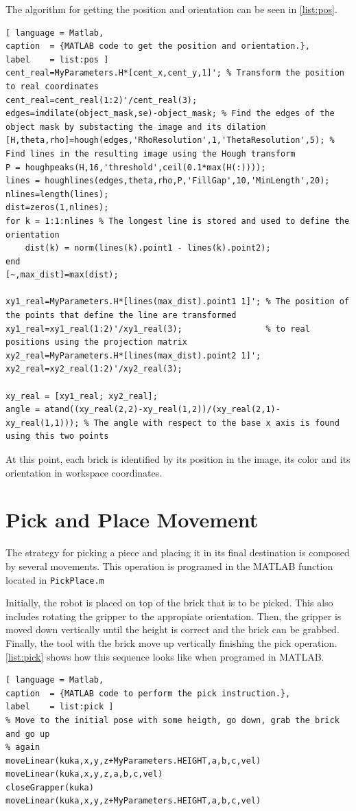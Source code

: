 The algorithm for getting the position and orientation can be seen in \autoref{list:pos}.
%
\begin{lstlisting}[ language = Matlab,
caption  = {MATLAB code to get the position and orientation.},
label    = list:pos ]
cent_real=MyParameters.H*[cent_x,cent_y,1]'; % Transform the position to real coordinates
cent_real=cent_real(1:2)'/cent_real(3);
edges=imdilate(object_mask,se)-object_mask; % Find the edges of the object mask by substacting the image and its dilation
[H,theta,rho]=hough(edges,'RhoResolution',1,'ThetaResolution',5); % Find lines in the resulting image using the Hough transform
P = houghpeaks(H,16,'threshold',ceil(0.1*max(H(:))));
lines = houghlines(edges,theta,rho,P,'FillGap',10,'MinLength',20);
nlines=length(lines);
dist=zeros(1,nlines);
for k = 1:1:nlines % The longest line is stored and used to define the orientation
    dist(k) = norm(lines(k).point1 - lines(k).point2);
end
[~,max_dist]=max(dist);

xy1_real=MyParameters.H*[lines(max_dist).point1 1]'; % The position of the points that define the line are transformed
xy1_real=xy1_real(1:2)'/xy1_real(3);                 % to real positions using the projection matrix
xy2_real=MyParameters.H*[lines(max_dist).point2 1]';
xy2_real=xy2_real(1:2)'/xy2_real(3);

xy_real = [xy1_real; xy2_real];
angle = atand((xy_real(2,2)-xy_real(1,2))/(xy_real(2,1)-xy_real(1,1))); % The angle with respect to the base x axis is found using this two points
\end{lstlisting}

At this point, each brick is identified by its position in the image, its color and its orientation in workspace coordinates.

\section{Pick and Place Movement}
The strategy for picking a piece and placing it in its final destination is composed by several movements. This operation is programed in the MATLAB function located in \lstinline[style=matlabinline]{PickPlace.m}

Initially, the robot is placed on top of the brick that is to be picked. This also includes rotating the gripper to the appropiate orientation. Then, the gripper is moved down vertically until the height is correct and the brick can be grabbed. Finally, the tool with the brick move up vertically finishing the pick operation. \autoref{list:pick} shows how this sequence looks like when programed in MATLAB.
%
\begin{lstlisting}[ language = Matlab,
caption  = {MATLAB code to perform the pick instruction.},
label    = list:pick ]
% Move to the initial pose with some heigth, go down, grab the brick and go up
% again
moveLinear(kuka,x,y,z+MyParameters.HEIGHT,a,b,c,vel)
moveLinear(kuka,x,y,z,a,b,c,vel)
closeGrapper(kuka)
moveLinear(kuka,x,y,z+MyParameters.HEIGHT,a,b,c,vel)
\end{lstlisting}


